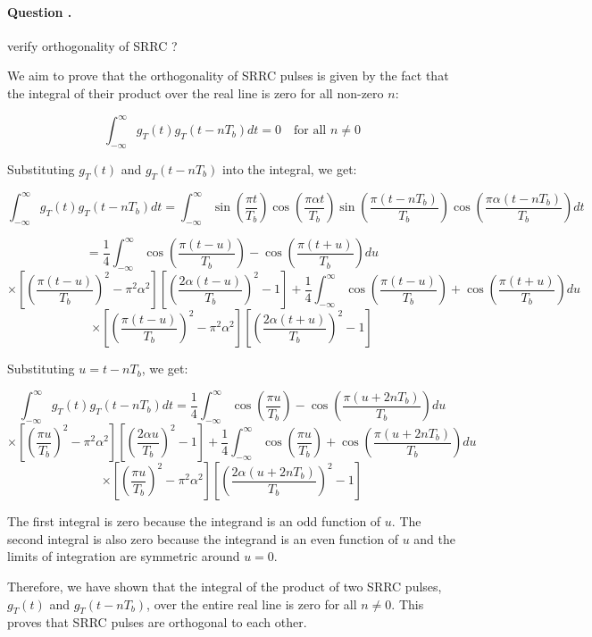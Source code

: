 \documentclass[14pt,a4paper]{report}
\newcounter{question}
\newcommand*\question{%
\stepcounter{question}%
\paragraph{Question \thesection.\thequestion}}
\begin{document}
\question
{
    verify orthogonality of SRRC ?
}
\begin{answer_box*}
We aim to prove that the orthogonality of SRRC pulses is given by the fact that the integral of their product over the real line is zero for all non-zero $n$:


\begin{equation}
    \int_{-\infty}^{\infty} g_T(t)g_T(t-nT_b)dt = 0 \quad \text{for all } n \neq 0
\end{equation}


Substituting $g_T(t)$ and $g_T(t-nT_b)$ into the integral, we get:


\begin{equation}
\int_{-\infty}^{\infty} g_T(t)g_T(t-nT_b)dt = \int_{-\infty}^{\infty} \sin\left(\frac{\pi t}{T_b}\right)\cos\left(\frac{\pi \alpha t}{T_b}\right)\sin\left(\frac{\pi(t-nT_b)}{T_b}\right)\cos\left(\frac{\pi \alpha(t-nT_b)}{T_b}\right)dt
\end{equation}

$$=\frac{1}{4}\int_{-\infty}^{\infty} \cos\left(\frac{\pi(t-u)}{T_b}\right)-\cos\left(\frac{\pi(t+u)}{T_b}\right)du$$
$$\times\left[\left(\frac{\pi(t-u)}{T_b}\right)^2-\pi^2\alpha^2\right]\left[\left(\frac{2\alpha(t-u)}{T_b}\right)^2-1\right]+\frac{1}{4}\int_{-\infty}^{\infty} \cos\left(\frac{\pi(t-u)}{T_b}\right)+\cos\left(\frac{\pi(t+u)}{T_b}\right)du$$
$$\times\left[\left(\frac{\pi(t-u)}{T_b}\right)^2-\pi^2\alpha^2\right]\left[\left(\frac{2\alpha(t+u)}{T_b}\right)^2-1\right]$$

Substituting $u=t-nT_b$, we get:

$$\int_{-\infty}^{\infty} g_T(t)g_T(t-nT_b)dt = \frac{1}{4}\int_{-\infty}^{\infty} \cos\left(\frac{\pi u}{T_b}\right)-\cos\left(\frac{\pi(u+2nT_b)}{T_b}\right)du$$
$$\times\left[\left(\frac{\pi u}{T_b}\right)^2-\pi^2\alpha^2\right]\left[\left(\frac{2\alpha u}{T_b}\right)^2-1\right]+\frac{1}{4}\int_{-\infty}^{\infty} \cos\left(\frac{\pi u}{T_b}\right)+\cos\left(\frac{\pi(u+2nT_b)}{T_b}\right)du$$
$$\times\left[\left(\frac{\pi u}{T_b}\right)^2-\pi^2\alpha^2\right]\left[\left(\frac{2\alpha(u+2nT_b)}{T_b}\right)^2-1\right]$$

The first integral is zero because the integrand is an odd function of $u$. The second integral is also zero because the integrand is an even function of $u$ and the limits of integration are symmetric around $u=0$.

Therefore, we have shown that the integral of the product of two SRRC pulses, $g_T(t)$ and $g_T(t-nT_b)$, over the entire real line is zero for all $n\neq 0$. This proves that SRRC pulses are orthogonal to each other.
\end{answer_box*}
\end{document}
